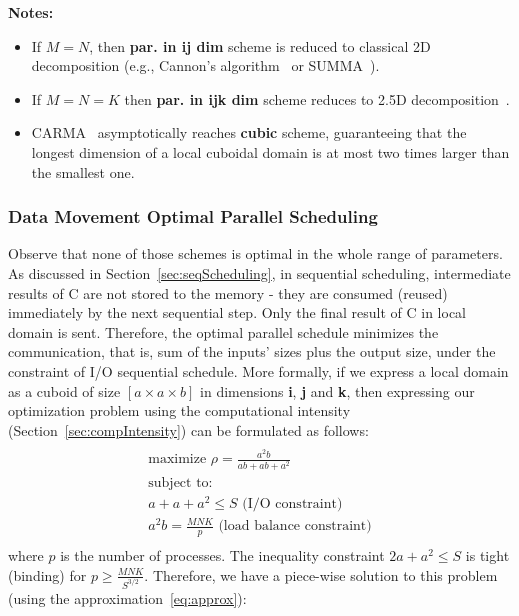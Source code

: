 \documentclass[sigplan,review,anonymous]{acmart}\settopmatter{printfolios=true,printccs=false,printacmref=false}
\begin{document}
\textbf{Notes:}

\begin{itemize}
	\item If $M = N$, then \textbf{par. in ij dim} scheme is reduced to 
	classical 2D 
	decomposition (e.g., Cannon's algorithm~\cite{Cannon} or 
	SUMMA~\cite{summa}). 
	\item If $M = N = K$ then \textbf{par. in ijk dim} scheme reduces to 2.5D 
	decomposition~\cite{25d}.
	\item CARMA~\cite{CARMA} asymptotically reaches \textbf{cubic} scheme, 
	guaranteeing that 
	the longest dimension of a local cuboidal domain is at most two times 
	larger than the 
	smallest one.
\end{itemize}

\subsubsection{Data Movement Optimal Parallel Scheduling}
Observe that none of those schemes is optimal in the whole range of parameters.
As discussed in Section~\ref{sec:seqScheduling}, in sequential scheduling, 
intermediate results of C are not stored to the memory - they are consumed 
(reused) immediately by the next sequential step. Only the final result of C in 
local domain is sent. Therefore, the optimal parallel schedule minimizes the 
communication, that is, sum of the inputs' sizes plus the output size, under 
the constraint of I/O sequential schedule. More formally, if we express a local 
domain as a cuboid of size $[a \times a \times b]$ in dimensions \textbf{i}, 
\textbf{j} and \textbf{k}, then expressing our optimization problem using the 
computational intensity (Section~\ref{sec:compIntensity}) can be formulated as 
follows:
\begin{multline}
\\
\text{maximize } \rho = \frac{a^2b}{ab + ab + a^2}\\
\text{subject to: } \\
a + a + a^2 \le S \text{ (I/O constraint)} \\
a^2b = \frac{MNK}{p} \text{ (load balance constraint)} \\ 
\end{multline}
where $p$ is the number of processes. The inequality constraint $2a + a^2 \le 
S$ is tight (binding) for $p \ge \frac{MNK}{S^{3/2}}$. Therefore, we have a 
piece-wise solution to this problem (using the approximation~\ref{eq:approx}):
\end{document}
